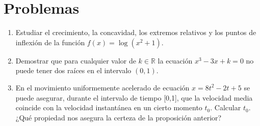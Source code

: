 \documentclass[a4paper]{article}
\begin{document}
\section*{Problemas}
\begin{enumerate}[leftmargin=*]

\item Estudiar el crecimiento, la concavidad, los extremos relativos y los puntos de inflexión de la función $f(x)=\log(x^2+1)$.

\item  Demostrar que para cualquier valor de $k\in \mathbb{R}$ la
ecuación $x^3-3x+k=0$ no puede tener dos raíces en el
intervalo $(0,1)$.

\item  En el movimiento uniformemente acelerado de ecuación
$x=8t^2-2t+5$ se puede asegurar, durante el intervalo de tiempo
[0,1], que la velocidad media coincide con la velocidad
instantánea en un cierto momento $t_{0}$. Calcular $t_{0}$.
¿Qué propiedad nos asegura la certeza de la proposición
anterior?
\end{enumerate}
\end{document}
